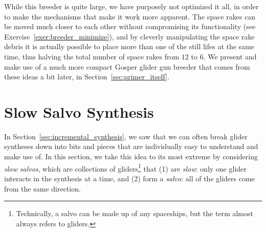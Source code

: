 While this breeder is quite large, we have purposely not optimized it all, in order to make the mechanisms that make it work more apparent. The space rakes can be moved much closer to each other without compromising its functionality (see Exercise~\ref{exer:breeder_minimize}), and by cleverly manipulating the space rake debris it is actually possible to place more than one of the still lifes at the same time, thus halving the total number of space rakes from $12$ to $6$. We present and make use of a much more compact Gosper glider gun breeder that comes from these ideas a bit later, in Section~\ref{sec:primer_itself}.



\section{Slow Salvo Synthesis}\label{sec:slow_salvo}

In Section~\ref{sec:incremental_synthesis}, we saw that we can often break glider syntheses down into bits and pieces that are individually easy to understand and make use of. In this section, we take this idea to its most extreme by considering \emph{slow salvos}, which are collections of gliders\footnote{Technically, a salvo can be made up of any spaceships, but the term almost always refers to gliders.} that (1) are \emph{slow}: only one glider interacts in the synthesis at a time, and (2) form a \emph{salvo}: all of the gliders come from the same direction.

